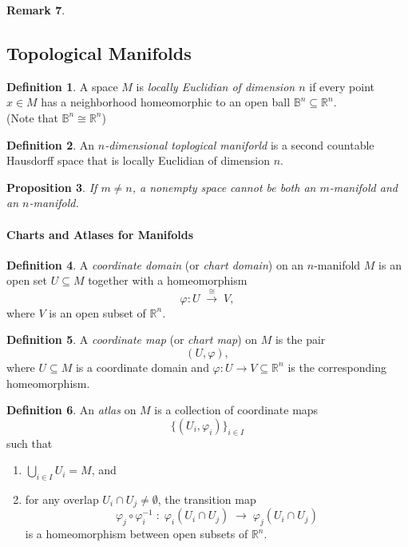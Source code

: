 \documentclass[11pt,a4paper]{article}
\theoremstyle{definition}
\newtheorem{definition}{Definition}[section]
\newtheorem{remark}[definition]{Remark}
\theoremstyle{plain}
\newtheorem{proposition}[definition]{Proposition}
\theoremstyle{remark}
\begin{document}
\begin{remark}
\subsection{Topological Manifolds} 
\begin{definition}
  A space $M$ is \emph{locally Euclidian of dimension $n$} if every point $x \in M$ has a neighborhood 
  homeomorphic to an open ball $\mathbb{B}^n \subseteq \mathbb{R}^n$.  \\
  (Note that $\mathbb{B}^n \cong \mathbb{R}^n$)
\end{definition}

\begin{definition}
  An \emph{$n$-dimensional toplogical maniforld} is a second countable Hausdorff space that is locally Euclidian of 
  dimension $n$. 
\end{definition}

\begin{proposition}
  If $m \neq n$, a nonempty space cannot be both an $m$-manifold and an $n$-manifold. 
\end{proposition}

\paragraph{Charts and Atlases for Manifolds} 
\begin{definition}
  A \emph{coordinate domain} (or \emph{chart domain}) on an $n$-manifold $M$ is an open set
  $U \subseteq M$ together with a homeomorphism
  \[
    \varphi \colon U \;\xrightarrow{\;\cong\;}\; V,
  \]
  where $V$ is an open subset of $\mathbb{R}^n$.
\end{definition}

\begin{definition}
  A \emph{coordinate map} (or \emph{chart map}) on $M$ is the pair
  \[
    (U,\varphi),
  \]
  where $U\subseteq M$ is a coordinate domain and
  $\varphi \colon U \to V \subseteq \mathbb{R}^n$ is the corresponding homeomorphism.
\end{definition}

\begin{definition}
  An \emph{atlas} on $M$ is a collection of coordinate maps
  \[
    \{(U_i,\varphi_i)\}_{i\in I}
  \]
  such that
  \begin{enumerate}
    \item $\displaystyle \bigcup_{i\in I} U_i = M$, and
    \item for any overlap $U_i \cap U_j \neq \emptyset$, the transition map
      \[
        \varphi_j \circ \varphi_i^{-1} \;\colon\; \varphi_i(U_i \cap U_j)\;\longrightarrow\;\varphi_j(U_i \cap U_j)
      \]
      is a homeomorphism between open subsets of $\mathbb{R}^n$.
  \end{enumerate}
\end{definition}


\end{remark}
\end{document}
